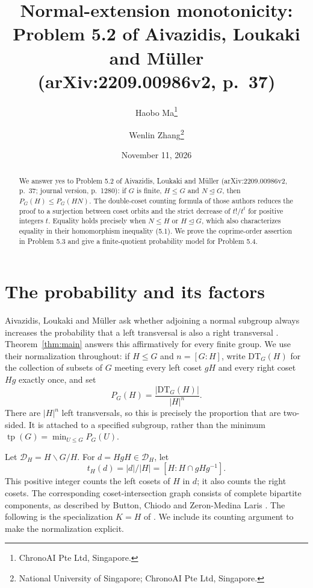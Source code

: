 \documentclass[11pt]{article}
\title{Normal-extension monotonicity:\protect\\
Problem 5.2 of Aivazidis, Loukaki and M\"uller\protect\\
(arXiv:2209.00986v2, p.~37)}
\author{Haobo Ma\thanks{ChronoAI Pte Ltd, Singapore.}\and
Wenlin Zhang\thanks{National University of Singapore; ChronoAI Pte Ltd, Singapore.}}
\date{November 11, 2026}
\newcommand{\PP}{P}
\newcommand{\DD}{\mathcal D}
\begin{document}
\maketitle
\begin{abstract}
We answer yes to Problem 5.2 of Aivazidis,
Loukaki and M\"uller (arXiv:2209.00986v2, p.~37; journal version, p.~1280):
if $G$ is finite, $H\leq G$ and $N\trianglelefteq G$, then
$\PP_G(H)\leq\PP_G(HN)$. The double-coset counting formula of those authors
reduces the proof to a surjection between coset orbits and the strict decrease
of $t!/t^t$ for positive integers $t$. Equality holds precisely when
$N\leq H$ or $H\trianglelefteq G$, which also characterizes equality in their
homomorphism inequality (5.1). We prove the coprime-order assertion in
Problem 5.3 and give a finite-quotient probability model for Problem 5.4.
\end{abstract}

\section{The probability and its factors}
Aivazidis, Loukaki and M\"uller ask whether adjoining a normal subgroup always
increases the probability that a left transversal is also a right transversal
\cite[Problem 5.2]{ALM}. Theorem~\ref{thm:main} answers this affirmatively for
every finite group. We use their normalization throughout: if $H\leq G$ and
$n=[G:H]$, write $\mathrm{DT}_G(H)$ for the collection of subsets of $G$
meeting every left coset $gH$ and every right coset $Hg$ exactly once, and set
\begin{equation}\label{eq:definition}
 \PP_G(H)=\frac{|\mathrm{DT}_G(H)|}{|H|^n}.
\end{equation}
There are $|H|^n$ left transversals, so this is precisely the proportion that
are two-sided. It is attached to a specified subgroup, rather than the
minimum $\operatorname{tp}(G)=\min_{U\leq G}\PP_G(U)$.

Let $\DD_H=H\backslash G/H$. For $d=HgH\in\DD_H$, let
\[
 t_H(d)=|d|/|H|=[H:H\cap gHg^{-1}].
\]
This positive integer counts the left cosets of $H$ in $d$; it also counts
the right cosets. The corresponding coset-intersection graph consists of
complete bipartite components, as described by Button, Chiodo and
Zeron-Medina Laris \cite[Theorem 3 and Proposition 6]{BCZ}.
The following is the specialization $K=H$ of
\cite[Proposition 3.2]{ALM}. We include its counting argument to make the
normalization explicit.
\end{document}
